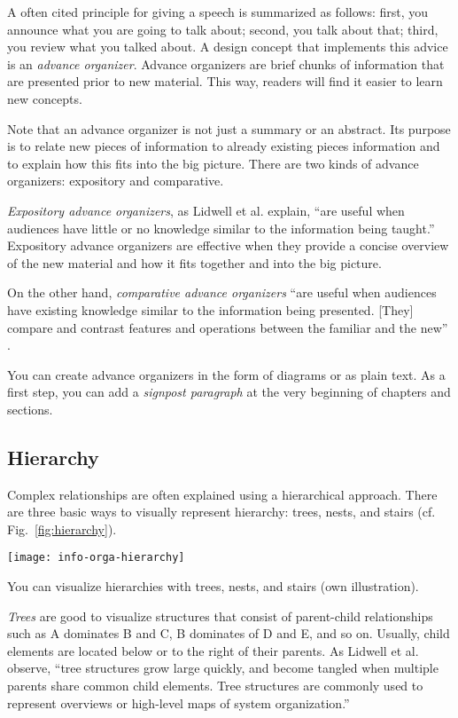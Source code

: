 A often cited principle for giving a speech is summarized as follows: first, you announce what you are going to talk about; second, you talk about that; third, you review what you talked about. A design concept that implements this advice is an \emph{advance organizer}. Advance organizers are brief chunks of information that are presented prior to new material. This way, readers will find it easier to learn new concepts.

Note that an advance organizer is not just a summary or an abstract. Its purpose is to relate new pieces of information to already existing pieces information and to explain how this fits into the big picture. There are two kinds of advance organizers: expository and comparative.

\emph{Expository advance organizers}, as Lidwell et al. \cite{Lidwell10} explain, ``are useful when audiences have little or no knowledge similar to the information being taught.'' Expository advance organizers are effective when they provide a concise overview of the new material and how it fits together and into the big picture.

On the other hand, \emph{comparative advance organizers} ``are useful when audiences have existing knowledge similar to the information being presented. [They] compare and contrast features and operations between the familiar and the new'' \cite{Lidwell10}.

You can create advance organizers in the form of diagrams or as plain text. As a first step, you can add a \emph{signpost paragraph} at the very beginning of chapters and sections.

\subsection{Hierarchy}

Complex relationships are often explained using a hierarchical approach. 
There are three basic ways to visually represent hierarchy: trees, nests, and stairs (cf. Fig.~\ref{fig:hierarchy}).


\begin{marginfigure}
\centering
\texttt{[image: info-orga-hierarchy]}
\caption{\label{fig:hierarchy} You can visualize hierarchies with trees, nests, and stairs (own illustration).}%
\end{marginfigure}


\emph{Trees} are good to visualize structures that consist of parent-child relationships such as A dominates B and C, B dominates of D and E, and so on. 
Usually, child elements are located below or to the right of their parents. As Lidwell et al. \cite{Lidwell10} observe, ``tree structures grow large quickly, and become tangled when multiple parents share common child elements. Tree structures are commonly used to represent overviews or high-level maps of system organization.''

